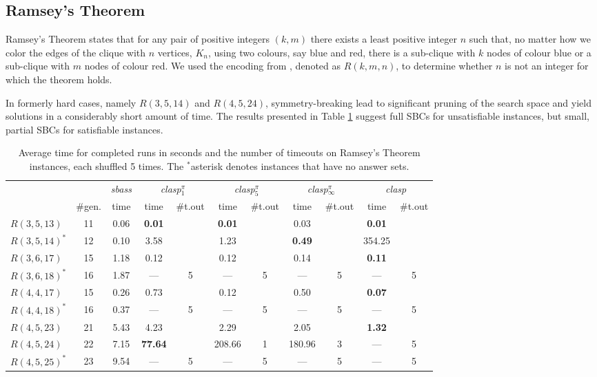 \documentclass[envcountsame]{llncs}
\newcommand{\systemname}[1]{\emph{#1}}
\begin{document}
\subsection{Ramsey's Theorem}
Ramsey's Theorem states that for any pair of positive integers $(k,m)$ there exists a least positive integer $n$ such that, no matter how we color the edges of the clique with $n$ vertices, $K_n$, using two colours, say blue and red, there is a sub-clique with $k$ nodes of colour blue or a sub-clique with $m$ nodes of colour red. We used the encoding from \cite{lepffaeigopesc02a}, denoted as $R(k,m,n)$, to determine whether $n$ is not an integer for which the theorem holds.

In formerly hard cases, namely $R(3,5, 14)$ and $R(4,5, 24)$, symmetry-breaking lead to significant pruning of the search space and yield solutions in a considerably short amount of time. The results presented in Table \ref{tab:ramsey} suggest full SBCs for unsatisfiable instances, but small, partial SBCs for satisfiable instances.

\begin{table}
\caption{Average time for completed runs in seconds and the number of timeouts on Ramsey's Theorem instances, each shuffled 5 times. The $^\ast$asterisk denotes instances that have no answer sets.\label{tab:ramsey}}
\centering
\begin{tabular}{lcccccccccc}
\hline\noalign{\smallskip}
 & & \systemname{sbass} & \multicolumn{2}{c}{\systemname{clasp}$_1^\pi$} & \multicolumn{2}{c}{\systemname{clasp}$_5^\pi$} & \multicolumn{2}{c}{\systemname{clasp}$_\infty^\pi$} & \multicolumn{2}{c}{\systemname{clasp}}\\ 
   & \#gen. & time & time & \#t.out & time & \#t.out & time & \#t.out & time & \#t.out\\
\noalign{\smallskip}
\hline
\noalign{\smallskip}
$R(3,5, 13)$ & 11 & 0.06 & \textbf{0.01} &  &  \textbf{0.01} &  &  0.03 &  &  \textbf{0.01} &  \\
$R(3,5, 14)^\ast$ & 12 & 0.10 &  3.58 &  &  1.23 &  &  \textbf{0.49} &  &354.25 &  \\
$R(3,6, 17)$ & 15 & 1.18 &  0.12 &  &  0.12 &  &  0.14 &  &  \textbf{0.11} &  \\
$R(3,6, 18)^\ast$ & 16 & 1.87 & ---   & 5&  ---  & 5& ---   & 5& ---   & 5\\
$R(4,4, 17)$ & 15 & 0.26 &  0.73 &  &  0.12 &  &  0.50 &  &  \textbf{0.07} &  \\
$R(4,4, 18)^\ast$ & 16 & 0.37 & ---   & 5&  ---  & 5& ---   & 5& ---   & 5\\
$R(4,5, 23)$ & 21 & 5.43 &  4.23 &  &  2.29 &  &  2.05 &  &  \textbf{1.32} &  \\
$R(4,5, 24)$ & 22 & 7.15 & \textbf{77.64} &  &208.66 & 1&180.96 & 3& ---   & 5\\
$R(4,5, 25)^\ast$ & 23 & 9.54 & ---   & 5& ---   & 5& ---   & 5& ---   & 5\\
\hline
\end{tabular}
\end{table}
\end{document}
